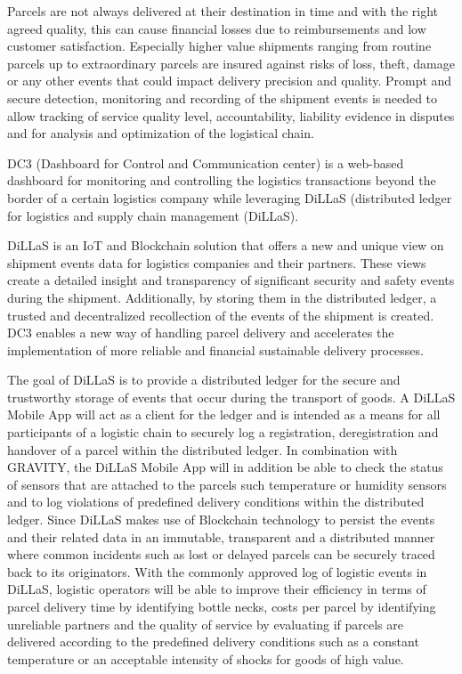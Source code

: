 Parcels are not always delivered at their destination in time and with the right agreed quality, this can cause financial losses due to reimbursements and low customer satisfaction. Especially higher value shipments ranging from routine parcels up to extraordinary parcels are insured against risks of loss, theft, damage or any other events that could impact delivery precision and quality. Prompt and secure detection, monitoring and recording of the shipment events is needed to allow tracking of service quality level, accountability, liability evidence in disputes and for analysis and optimization of the logistical chain.

DC3 (Dashboard for Control and Communication center) is a web-based dashboard for monitoring and controlling the logistics transactions beyond the border of a certain logistics company while leveraging DiLLaS (distributed ledger for logistics and supply chain management (DiLLaS). 

DiLLaS is an IoT and Blockchain solution that offers a new and unique view on shipment events data for logistics companies and their partners. These views create a detailed insight and transparency of significant security and safety events during the shipment. Additionally, by storing them in the distributed ledger, a trusted and decentralized recollection of the events of the shipment is created. DC3 enables a new way of handling parcel delivery and accelerates the implementation of more reliable and financial sustainable delivery processes.

The goal of DiLLaS is to provide a distributed ledger for the secure and trustworthy storage of events that occur during the transport of goods. A DiLLaS Mobile App will act as a client for the ledger and is intended as a means for all participants of a logistic chain to securely log a registration, deregistration and handover of a parcel within the distributed ledger. In combination with GRAVITY, the DiLLaS Mobile App will in addition be able to check the status of sensors that are attached to the parcels such temperature or humidity sensors and to log violations of predefined delivery conditions within the distributed ledger. Since DiLLaS makes use of Blockchain technology to persist the events and their related data in an immutable, transparent and a distributed manner where common incidents such as lost or delayed parcels can be securely traced back to its originators. With the commonly approved log of logistic events in DiLLaS, logistic operators will be able to improve their efficiency in terms of parcel delivery time by identifying bottle necks, costs per parcel by identifying unreliable partners and the quality of service by evaluating if parcels are delivered according to the predefined delivery conditions such as a constant temperature or an acceptable intensity of shocks for goods of high value. 


